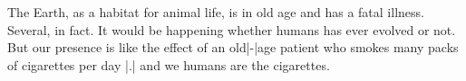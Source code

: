 The Earth, as a habitat for animal life, is in old age and
has a fatal illness. Several, in fact. It would be happening
whether humans has ever evolved or not. But our presence is
like the effect of an old|-|age patient who smokes many packs
of cigarettes per day |.| and we humans are the cigarettes.